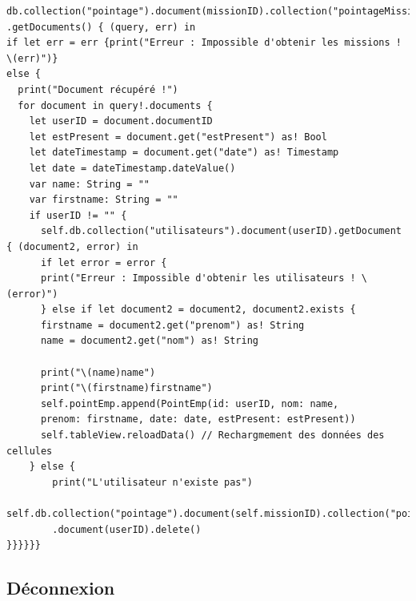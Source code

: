 \documentclass{article}
\begin{document}
\newpage

\begin{verbatim}
db.collection("pointage").document(missionID).collection("pointageMission")
.getDocuments() { (query, err) in
if let err = err {print("Erreur : Impossible d'obtenir les missions ! \(err)")}
else {
  print("Document récupéré !")
  for document in query!.documents {
    let userID = document.documentID
    let estPresent = document.get("estPresent") as! Bool
    let dateTimestamp = document.get("date") as! Timestamp
    let date = dateTimestamp.dateValue()
    var name: String = ""
    var firstname: String = ""
    if userID != "" {
      self.db.collection("utilisateurs").document(userID).getDocument { (document2, error) in
      if let error = error {
      print("Erreur : Impossible d'obtenir les utilisateurs ! \(error)")
      } else if let document2 = document2, document2.exists {
      firstname = document2.get("prenom") as! String
      name = document2.get("nom") as! String

      print("\(name)name")
      print("\(firstname)firstname")
      self.pointEmp.append(PointEmp(id: userID, nom: name, 
      prenom: firstname, date: date, estPresent: estPresent))
      self.tableView.reloadData() // Rechargmement des données des cellules
    } else {
		print("L'utilisateur n'existe pas")
        self.db.collection("pointage").document(self.missionID).collection("pointageMission")
        .document(userID).delete()
}}}}}}
\end{verbatim}

\subsection{Déconnexion}
\end{document}
